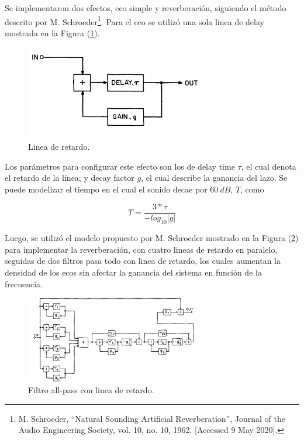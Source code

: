 Se implementaron dos efectos, eco simple y reverberación, siguiendo el método descrito por M. Schroeder\footnote{M. Schroeder, ``Natural Sounding Artificial Reverberation'', Journal of the Audio Engineering Society, vol. 10, no. 10, 1962. [Accessed 9 May 2020].}. Para el eco se utilizó una sola linea de delay mostrada en la Figura (\ref{delay}).
\begin{figure}[H]
	\centering
	\includegraphics[width=0.7\textwidth]{ImagenesEjercicio6/delay.png}
	\caption{Linea de retardo.}
	\label{delay}
\end{figure}

Los parámetros para configurar este efecto son los de delay time $\tau$, el cual denota el retardo de la línea; y decay factor $g$, el cual describe la ganancia del lazo. Se puede modelizar el tiempo en el cual el sonido decae por $60 \ dB$, $T$, como

\begin{equation}
T = \frac{3*\tau }{-log_{10} | g | }
\label{delayeq}
\end{equation}

Luego, se utilizó el modelo propuesto por M. Schroeder mostrado en la Figura (\ref{rev}) para implementar la reverberación, con cuatro lineas de retardo en paralelo, seguidas de dos filtros pasa todo con linea de retardo, los cuales aumentan la densidad de los ecos sin afectar la ganancia del sistema en función de la frecuencia.

\begin{figure}[H]
	\centering
	\includegraphics[width=0.7\textwidth]{ImagenesEjercicio6/rev.png}
	\caption{Filtro all-pass con linea de retardo.}
	\label{rev}
\end{figure}

